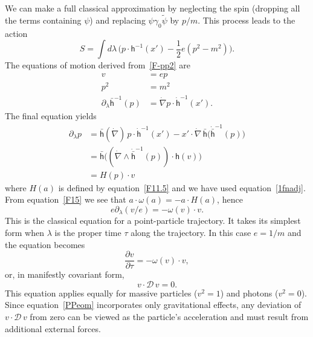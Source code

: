 \documentclass[a4paper]{article}
\numberwithin{equation}{section}
\newcommand{\nn}{\nonumber}
\newcommand{\dt}{\! \cdot \!}
\newcommand{\wdg}{\! \wedge \!}
\newcommand{\half}{{\textstyle \frac{1}{2}}}
\newcommand{\lam}{\lambda}
\newcommand{\om}{\omega}
\newcommand{\cld}{{\mathcal{D}}}
\newcommand{\go}{\gamma_{0}}
\newcommand{\psirev}{\tilde{\psi}}
\newcommand{\lih}{\mathsf{h}}
\newcommand{\lbh}{\bar{\mathsf{h}}}
\newcommand{\ho}{\lbh}
\newcommand{\hu}{\lih}
\newcommand{\grad}{\nabla}
\newcommand{\dgrad}{\dot{\grad}}
\newcommand{\deriv}[2]{\frac{\partial #1}{\partial #2}}
\begin{document}
We can make a full classical approximation by neglecting the spin
(dropping all the terms containing $\psi$) and replacing
$\psi\go\psirev$ by $p/m$.  This process leads to the action
%
\begin{equation}
S = \int d\lam \, \bigl( p \dt \hu^{-1}(x') - \half e (p^2-m^2) \bigr) .
\label{F-pp2}
\end{equation}
%
The equations of motion derived from~\eqref{F-pp2} are
%
\begin{align}
v &= e p  \\
p^2 &= m^2 \\ 
\partial_\lam \ho^{-1}(p) &= \dgrad p \dt \dot{\hu}^{-1}(x').
\label{F-pp2.5}
\end{align}
%
The final  equation yields
%
\begin{align}
\partial_\lam p &= \ho(\dgrad) \, p \dt \dot{\hu}^{-1}(x') - 
x' \dt \dgrad \,  \ho\bigl( \dot{\ho}^{-1}(p) \bigr) \nn \\
&= \ho\bigl( (\dgrad \wdg \dot{\ho}^{-1}(p)) \dt \hu(v) \bigr) \nn \\
&= H(p) \dt v 
\end{align}
%
where $H(a)$ is defined by equation~\eqref{F11.5} and we have used
equation~\eqref{1fnadj}.  From equation~\eqref{F15} we see that
$a\dt\om(a)=-a\dt H(a)$, hence
%
\begin{equation}
e \partial_\lam (v/e) = -\om(v)\dt v.
\end{equation}
%
This is the classical equation for a point-particle trajectory.  It
takes its simplest form when $\lam$ is the proper time $\tau$ along
the trajectory.  In this case $e=1/m$ and the equation becomes
%
\begin{equation}
\deriv{v}{\tau} = -\om(v)\dt v,
\end{equation}
%
or, in manifestly covariant form,
%
\begin{equation}
v \dt \cld \, v = 0.
\label{PPeom}
\end{equation}
%
This equation applies equally for massive particles ($v^2=1$) and
photons ($v^2=0$).  Since equation~\eqref{PPeom} incorporates only
gravitational effects, any deviation of $v\dt\cld \, v$ from zero can be
viewed as the particle's acceleration and must result from additional
external forces.
\end{document}

